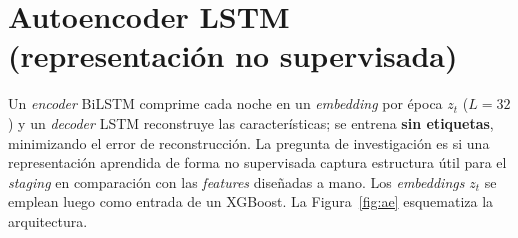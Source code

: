 \documentclass[conference]{IEEEtran}
\begin{document}
\section{Autoencoder LSTM (representación no supervisada)}\label{appendix:lstm_ae}

Un \emph{encoder} BiLSTM comprime cada noche en un \emph{embedding} por época $z_t$ ($L=32$) y un \emph{decoder} LSTM reconstruye las características; se entrena \textbf{sin etiquetas}, minimizando el error de reconstrucción. La pregunta de investigación es si una representación aprendida de forma no supervisada captura estructura útil para el \emph{staging} en comparación con las \emph{features} diseñadas a mano. Los \emph{embeddings} $z_t$ se emplean luego como entrada de un XGBoost. La Figura~\ref{fig:ae}
esquematiza la arquitectura.
\end{document}
